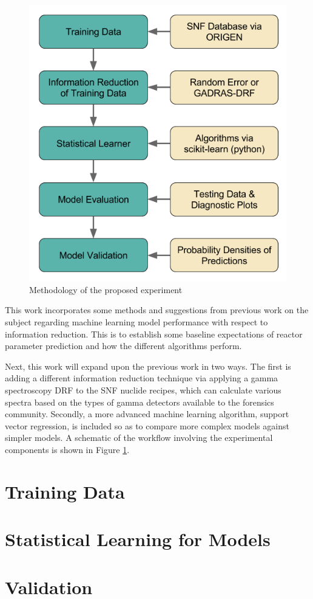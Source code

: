 \begin{figure}[!htb]
  \centering
  \includegraphics[width=0.9\linewidth]{./chapters/demo_method/methodology.png}
  \caption{Methodology of the proposed experiment}
  \label{fig:method}
\end{figure}

This work incorporates some methods and suggestions from previous work on the
subject \cite{dayman_feasibility_2013} regarding machine learning model
performance with respect to information reduction.  This is to establish some
baseline expectations of reactor parameter prediction and how the different
algorithms perform. 

Next, this work will expand upon the previous work in two ways.  The first is
adding a different information reduction technique via applying a gamma
spectroscopy \gls{DRF} to the \gls{SNF} nuclide recipes, which can calculate
various spectra based on the types of gamma detectors available to the
forensics community.  Secondly, a more advanced machine learning algorithm,
support vector regression, is included so as to compare more complex models
against simpler models.  A schematic of the workflow involving the experimental
components is shown in Figure \ref{fig:method}.

\section{Training Data}
\label{sec:training}


\section{Statistical Learning for Models}
\label{sec:statmodel}


\section{Validation}
\label{sec:valid}

